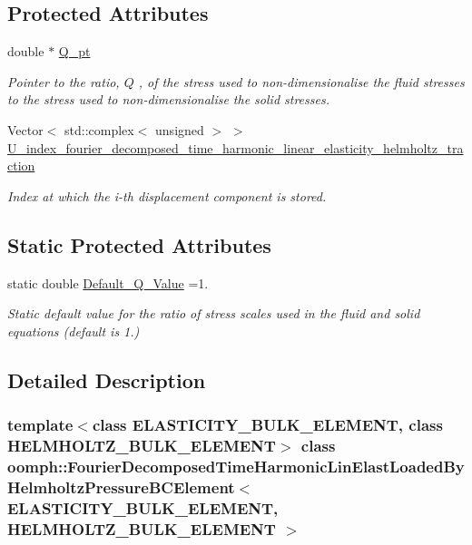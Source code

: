 \subsection*{Protected Attributes}
\begin{DoxyCompactItemize}
\item 
double $\ast$ \hyperlink{classoomph_1_1FourierDecomposedTimeHarmonicLinElastLoadedByHelmholtzPressureBCElement_ae9ffef6c7b99dcac84a59345b88e2938}{Q\+\_\+pt}
\begin{DoxyCompactList}\small\item\em Pointer to the ratio, $ Q $ , of the stress used to non-\/dimensionalise the fluid stresses to the stress used to non-\/dimensionalise the solid stresses. \end{DoxyCompactList}\item 
Vector$<$ std\+::complex$<$ unsigned $>$ $>$ \hyperlink{classoomph_1_1FourierDecomposedTimeHarmonicLinElastLoadedByHelmholtzPressureBCElement_a662382c12e52846a2407ef5ec948d92b}{U\+\_\+index\+\_\+fourier\+\_\+decomposed\+\_\+time\+\_\+harmonic\+\_\+linear\+\_\+elasticity\+\_\+helmholtz\+\_\+traction}
\begin{DoxyCompactList}\small\item\em Index at which the i-\/th displacement component is stored. \end{DoxyCompactList}\end{DoxyCompactItemize}
\subsection*{Static Protected Attributes}
\begin{DoxyCompactItemize}
\item 
static double \hyperlink{classoomph_1_1FourierDecomposedTimeHarmonicLinElastLoadedByHelmholtzPressureBCElement_a6a24eef8286abb640d8edf3fa0f71e2c}{Default\+\_\+\+Q\+\_\+\+Value} =1.
\begin{DoxyCompactList}\small\item\em Static default value for the ratio of stress scales used in the fluid and solid equations (default is 1.) \end{DoxyCompactList}\end{DoxyCompactItemize}


\subsection{Detailed Description}
\subsubsection*{template$<$class E\+L\+A\+S\+T\+I\+C\+I\+T\+Y\+\_\+\+B\+U\+L\+K\+\_\+\+E\+L\+E\+M\+E\+NT, class H\+E\+L\+M\+H\+O\+L\+T\+Z\+\_\+\+B\+U\+L\+K\+\_\+\+E\+L\+E\+M\+E\+NT$>$\newline
class oomph\+::\+Fourier\+Decomposed\+Time\+Harmonic\+Lin\+Elast\+Loaded\+By\+Helmholtz\+Pressure\+B\+C\+Element$<$ E\+L\+A\+S\+T\+I\+C\+I\+T\+Y\+\_\+\+B\+U\+L\+K\+\_\+\+E\+L\+E\+M\+E\+N\+T, H\+E\+L\+M\+H\+O\+L\+T\+Z\+\_\+\+B\+U\+L\+K\+\_\+\+E\+L\+E\+M\+E\+N\+T $>$}

